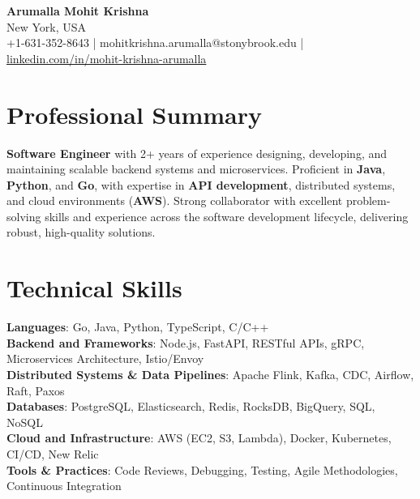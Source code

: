 \documentclass[letterpaper,11pt]{article}
\begin{document}
\begin{center}
  {\Large \textbf{Arumalla Mohit Krishna}} \\
  New York, USA \\
  +1-631-352-8643 \enspace | \enspace mohitkrishna.arumalla@stonybrook.edu \enspace | \enspace \href{https://www.linkedin.com/in/mohit-krishna-arumalla}{linkedin.com/in/mohit-krishna-arumalla}
\end{center}

\section{Professional Summary}
  \begin{itemize}[leftmargin=0.15in, label={}]
    \small{\item{
     \textbf{Software Engineer} with 2+ years of experience designing, developing, and maintaining scalable backend systems and microservices. Proficient in \textbf{Java}, \textbf{Python}, and \textbf{Go}, with expertise in \textbf{API development}, distributed systems, and cloud environments (\textbf{AWS}). Strong collaborator with excellent problem-solving skills and experience across the software development lifecycle, delivering robust, high-quality solutions.
    }}
  \end{itemize}
\vspace{-16pt}

\section{Technical Skills}
 \begin{itemize}[leftmargin=0.15in, label={}]
    \small{\item{
     \textbf{Languages}: Go, Java, Python, TypeScript, C/C++ \\
     \textbf{Backend and Frameworks}: Node.js, FastAPI, RESTful APIs, gRPC, Microservices Architecture, Istio/Envoy \\
     \textbf{Distributed Systems \& Data Pipelines}: Apache Flink, Kafka, CDC, Airflow, Raft, Paxos \\
     \textbf{Databases}: PostgreSQL, Elasticsearch, Redis, RocksDB, BigQuery, SQL, NoSQL \\
     \textbf{Cloud and Infrastructure}: AWS (EC2, S3, Lambda), Docker, Kubernetes, CI/CD, New Relic \\
     \textbf{Tools \& Practices}: Code Reviews, Debugging, Testing, Agile Methodologies, Continuous Integration
    }}
 \end{itemize}
\vspace{-16pt}
\end{document}
